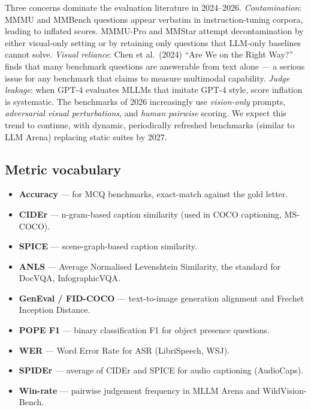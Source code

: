 \documentclass{article}
\begin{document}
Three concerns dominate the evaluation literature in 2024--2026. \emph{Contamination}: MMMU and MMBench questions appear verbatim in instruction-tuning corpora, leading to inflated scores. MMMU-Pro and MMStar \citep{chen20242024} attempt decontamination by either visual-only setting or by retaining only questions that LLM-only baselines cannot solve. \emph{Visual reliance}: Chen et al.~(2024) ``Are We on the Right Way?'' finds that many benchmark questions are answerable from text alone --- a serious issue for any benchmark that claims to measure multimodal capability. \emph{Judge leakage}: when GPT-4 evaluates MLLMs that imitate GPT-4 style, score inflation is systematic. The benchmarks of 2026 increasingly use \emph{vision-only} prompts, \emph{adversarial visual perturbations}, and \emph{human pairwise} scoring. We expect this trend to continue, with dynamic, periodically refreshed benchmarks (similar to LLM Arena) replacing static suites by 2027.

\subsection{Metric vocabulary}\label{metric-vocabulary}

\begin{itemize}

\item
  \textbf{Accuracy} --- for MCQ benchmarks, exact-match against the gold letter.
\item
  \textbf{CIDEr} --- n-gram-based caption similarity (used in COCO captioning, MS-COCO).
\item
  \textbf{SPICE} --- scene-graph-based caption similarity.
\item
  \textbf{ANLS} --- Average Normalised Levenshtein Similarity, the standard for DocVQA, InfographicVQA.
\item
  \textbf{GenEval / FID-COCO} --- text-to-image generation alignment and Frechet Inception Distance.
\item
  \textbf{POPE F1} --- binary classification F1 for object presence questions.
\item
  \textbf{WER} --- Word Error Rate for ASR (LibriSpeech, WSJ).
\item
  \textbf{SPIDEr} --- average of CIDEr and SPICE for audio captioning (AudioCaps).
\item
  \textbf{Win-rate} --- pairwise judgement frequency in MLLM Arena and WildVision-Bench.
\end{itemize}
\end{document}
